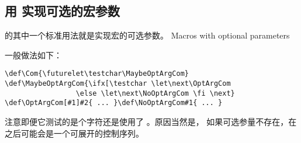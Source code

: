 \documentclass[letterpaper]{book}
\begin{document}
\subsection{用 \protect{} 实现可选的宏参数}

 的其中一个标准用法就是实现宏的可选参数。
\howto Macros with optional parameters\par
一般做法如下：
\begin{verbatim}
\def\Com{\futurelet\testchar\MaybeOptArgCom}
\def\MaybeOptArgCom{\ifx[\testchar \let\next\OptArgCom 
                 \else \let\next\NoOptArgCom \fi \next}
\def\OptArgCom[#1]#2{ ... }\def\NoOptArgCom#1{ ... }
\end{verbatim}
注意即便它测试的是个字符还是使用了 。原因当然是，
如果可选参量不存在，在  之后可能会是一个可展开的控制序列。
\end{document}
